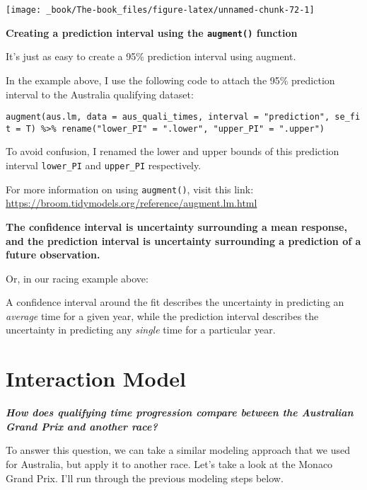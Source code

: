 \documentclass[
]{book}
\begin{document}
\begin{center}\texttt{[image: \_book/The-book\_files/figure-latex/unnamed-chunk-72-1]} \end{center}

\begin{blackbox}

\begin{center}
\textbf{Creating a prediction interval using the \texttt{augment()} function}

\end{center}

It's just as easy to create a 95\% prediction interval using augment.

In the example above, I use the following code to attach the 95\% prediction interval to the Australia qualifying dataset:

\texttt{augment(aus.lm,\ data\ =\ aus\_quali\_times,\ interval\ =\ "prediction",\ se\_fit\ =\ T)\ \%\textgreater{}\%\ rename("lower\_PI"\ =\ ".lower",\ "upper\_PI"\ =\ ".upper")}

To avoid confusion, I renamed the lower and upper bounds of this prediction interval \texttt{lower\_PI} and \texttt{upper\_PI} respectively.

For more information on using \texttt{augment()}, visit this link: \url{https://broom.tidymodels.org/reference/augment.lm.html}

\end{blackbox}

\textbf{The confidence interval is uncertainty surrounding a mean response, and the prediction interval is uncertainty surrounding a prediction of a future observation.}

Or, in our racing example above:

A confidence interval around the fit describes the uncertainty in predicting an \emph{average} time for a given year, while the prediction interval describes the uncertainty in predicting any \emph{single} time for a particular year.

\hypertarget{interaction-model}{%
\section{Interaction Model}\label{interaction-model}}

\textbf{\emph{How does qualifying time progression compare between the Australian Grand Prix and another race?}}

To answer this question, we can take a similar modeling approach that we used for Australia, but apply it to another race. Let's take a look at the Monaco Grand Prix. I'll run through the previous modeling steps below.
\end{document}

